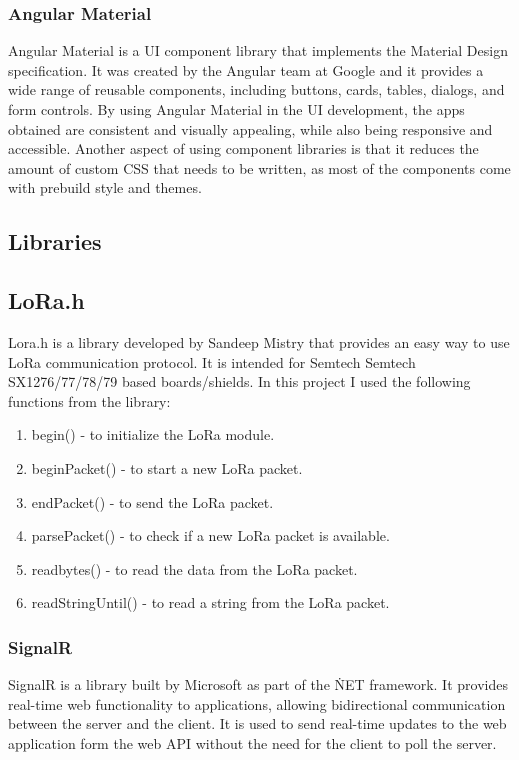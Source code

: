 \subsubsection{Angular Material}
Angular Material is a UI component library that implements the Material Design specification.
It was created by the Angular team at Google and it provides a wide range of reusable components, including 
buttons, cards, tables, dialogs, and form controls. By using Angular Material in the UI development, the apps obtained are consistent
and visually appealing, while also being responsive and accessible. Another aspect of using component libraries is that 
it reduces the amount of custom CSS that needs to be written, as most of the components come with prebuild style and themes\cite{material_design_spec}\cite{angular_material_docs}.


\subsection{Libraries}
\subsection{LoRa.h}
Lora.h is a library developed by Sandeep Mistry that provides an easy way to use LoRa communication protocol. 
It is intended for Semtech Semtech SX1276/77/78/79 based boards/shields\cite{arduino_lora_lib}.
In this project I used the following functions from the library: 
\begin{enumerate}
    \item begin() - to initialize the LoRa module.
    \item beginPacket() - to start a new LoRa packet.
    \item endPacket() - to send the LoRa packet.
    \item parsePacket() - to check if a new LoRa packet is available.
    \item readbytes() - to read the data from the LoRa packet.
    \item readStringUntil() - to read a string from the LoRa packet.
\end{enumerate}

\subsubsection{SignalR}
SignalR is a library built by Microsoft as part of the \.NET framework. It provides real-time web functionality to applications, allowing bidirectional
communication between the server and the client. It is used to send real-time updates to the web application form the web API 
without the need for the client to poll the server\cite{signalr_docs}.

